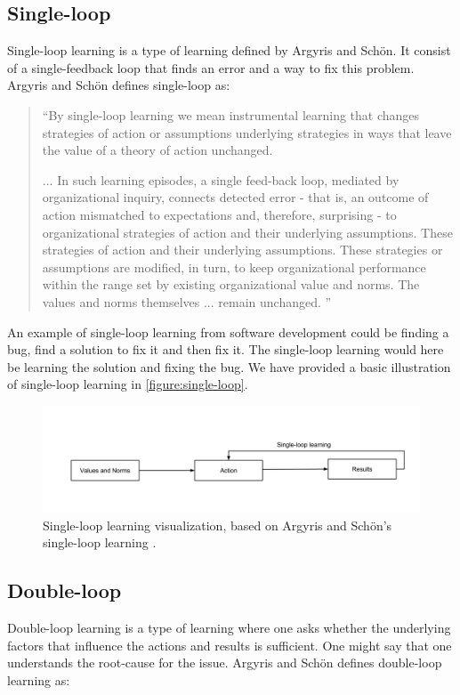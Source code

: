\subsection{Single-loop}
Single-loop learning is a type of learning defined by Argyris and Schön. It consist of a single-feedback loop that finds an error and a way to fix this problem. Argyris and Schön \cite{Argyris1996} defines single-loop as: 

\begin{quote}
``By single-loop learning we mean instrumental learning that changes strategies of action or assumptions underlying strategies in ways that leave the value of a theory of action unchanged.

... In such learning episodes, a single feed-back loop, mediated by organizational inquiry, connects detected error - that is, an outcome of action mismatched to expectations and, therefore, surprising - to organizational strategies of action and their underlying assumptions. These strategies of action and their underlying assumptions. These strategies or assumptions are modified, in turn, to keep organizational performance within the range set by existing organizational value and norms. The values and norms themselves ... remain unchanged. 
''
\end{quote}

An example of single-loop learning from software development could be finding a bug, find a solution to fix it and then fix it. The single-loop learning would here be learning the solution and fixing the bug. We have provided a basic illustration of single-loop learning in \autoref{figure:single-loop}.

\begin{figure}[!h]
	\centering
	\includegraphics[width=\textwidth, keepaspectratio]{figures/Single-loop.png}
	\caption{Single-loop learning visualization, based on Argyris and Schön's single-loop learning \cite{Argyris1996}.}
	\label{figure:single-loop}
\end{figure}

\subsection{Double-loop} %
\label{sub:double_loop}
Double-loop learning is a type of learning where one asks whether the underlying factors that influence the actions and results is sufficient.
One might say that one understands the root-cause for the issue. 
Argyris and Schön defines double-loop learning as: 

